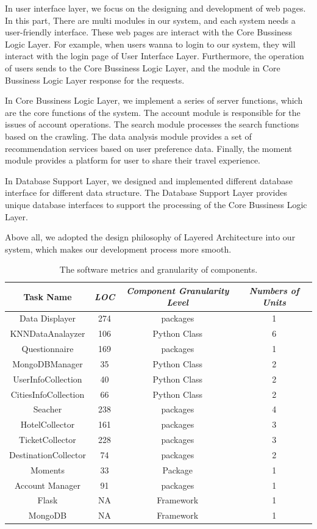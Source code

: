 \documentclass[conference]{IEEEtran}
\begin{document}
In user interface layer, we focus on the designing and development of web pages. In this part,  There are multi modules in our system, and each system needs a user-friendly interface. These web pages are interact with the Core Bussiness Logic Layer. For example, when users wanna to login to our system, they will interact with the login page of User Interface Layer. Furthermore, the operation of users sends to the Core Bussiness Logic Layer, and the module in Core Bussiness Logic Layer response for the requests.

In Core Bussiness Logic Layer, we implement a series of server functions, which are the core functions of the system. The account module is responsible for the issues of account operations. The search module processes the search functions based on the crawling. The data analysis module provides a set of recommendation services based on user preference data. Finally, the moment module provides a platform for user to share their travel experience.

In Database Support Layer, we designed and implemented different database interface for different data structure. The Database Support Layer provides unique database interfaces to support the processing of the Core Bussiness Logic Layer.

Above all, we adopted the design philosophy of Layered Architecture into our system, which makes our development process more smooth.



\begin{table}[htbp]
\caption{The software metrics and granularity of components.}
\begin{center}
\begin{tabular}{|c|c|c|c|}
\hline
\textbf{Task Name} & \textbf{\textit{LOC}}& \textbf{\textit{Component Granularity Level}}& \textbf{\textit{Numbers of Units}} \\
\hline
Data Displayer & 274  & packages & 1 \\
KNNDataAnalayzer & 106 & Python Class &  6 \\
Questionnaire & 169 & packages & 1 \\
MongoDBManager & 35 & Python Class & 2 \\
UserInfoCollection & 40 & Python Class & 2 \\
CitiesInfoCollection & 66 & Python Class & 2 \\
Seacher & 238 & packages & 4\\
HotelCollector & 161 & packages & 3\\
TicketCollector & 228 & packages & 3\\
DestinationCollector & 74 & packages & 2\\
Moments & 33 & Package & 1\\
Account Manager& 91 &packages&1\\

Flask & NA & Framework & 1 \\
MongoDB & NA & Framework & 1 \\

\hline
\end{tabular}
\label{tab1}
\end{center}
\end{table}
\end{document}
